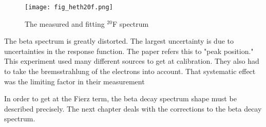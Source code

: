 \documentclass[main.tex]{subfiles}
\begin{document}
\begin{figure}[!htb]
	\centerline{\texttt{[image: fig\_heth20f.png]}}
	\caption{The measured and fitting $^{20}$F spectrum \cite{Het89}}
	\label{fig:heth20Fspec}
\end{figure}

The beta spectrum is greatly distorted.
The largest uncertainty is due to uncertainties in the response function.
The paper refers this to "peak position." 
This experiment used many different sources to get at calibration.
They also had to take the bremsstrahlung of the electrons into account.
That systematic effect was the limiting factor in their measurement

In order to get at the Fierz term, the beta decay spectrum shape must be described precisely.
The next chapter deals with the corrections to the beta decay spectrum.  
\end{document}
